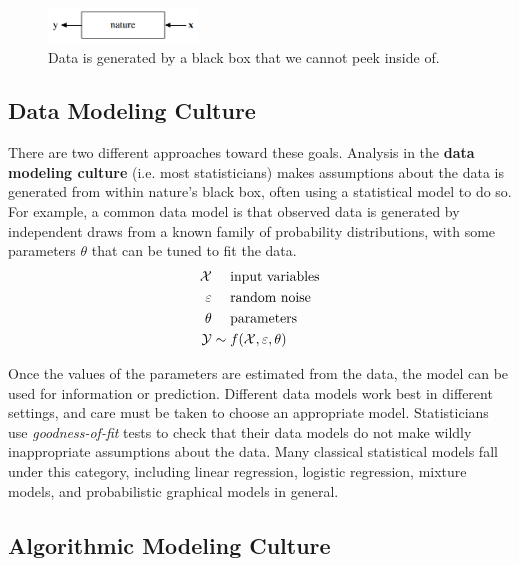 \documentclass{discussion}
\begin{document}
\begin{figure}[h!]
    \centering
    \includegraphics[width=150px]{images/nature-black-box}
    \caption{Data is generated by a black box that we cannot peek inside of.}
    \label{fig:nature-black-box}
\end{figure}

\subsection*{Data Modeling Culture}

There are two different approaches toward these goals.  Analysis in the \textbf{data modeling culture} (i.e. most statisticians) makes assumptions about the data is generated from within nature's black box, often using a statistical model to do so.  For example, a common data model is that observed data is generated by independent draws from a known family of probability distributions, with some parameters $\theta$ that can be tuned to fit the data.
%
\begin{align*}
    \mathcal{X} &\quad \text{ input variables} \\
    \varepsilon &\quad \text{ random noise} \\
    \theta &\quad \text{ parameters} \\
    \mathcal{Y} &\sim f(\mathcal{X}, \varepsilon, \theta)
\end{align*}

Once the values of the parameters are estimated from the data, the model can be used for information or prediction.  Different data models work best in different settings, and care must be taken to choose an appropriate model.  Statisticians use \textit{goodness-of-fit} tests to check that their data models do not make wildly inappropriate assumptions about the data.  Many classical statistical models fall under this category, including linear regression, logistic regression, mixture models, and probabilistic graphical models in general.

\subsection*{Algorithmic Modeling Culture}
\end{document}
